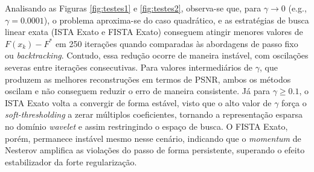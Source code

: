 \documentclass[12pt]{article}
\begin{document}
\begin{table}[H]
    \centering
    \caption{Comportamento Computacional de ISTA/FISTA e Qualidade por $\gamma$ (\textit{Wavelet})}
    \label{tab:wav_gammas}
\end{table}

Analisando as Figuras \ref{fig:testes1} e \ref{fig:testes2}, observa-se que, para $\gamma \to 0$ (e.g., $\gamma = 0.0001$), o problema aproxima-se do caso quadrático, e as estratégias de busca linear exata (ISTA Exato e FISTA Exato) conseguem atingir menores valores de $F(x_k) - F^*$ em 250 iterações quando comparadas às abordagens de passo fixo ou \textit{backtracking}. Contudo, essa redução ocorre de maneira instável, com oscilações severas entre iterações consecutivas. Para valores intermediários de $\gamma$, que produzem as melhores reconstruções em termos de PSNR, ambos os métodos oscilam e não conseguem reduzir o erro de maneira consistente. Já para $\gamma \ge 0.1$, o ISTA Exato volta a convergir de forma estável, visto que o alto valor de $\gamma$ força o \textit{soft-thresholding} a zerar múltiplos coeficientes, tornando a representação esparsa no domínio \textit{wavelet} e assim restringindo o espaço de busca. O FISTA Exato, porém, permanece instável mesmo nesse cenário, indicando que o \textit{momentum} de Nesterov amplifica as violações do passo de forma persistente, superando o efeito estabilizador da forte regularização. 
\end{document}
